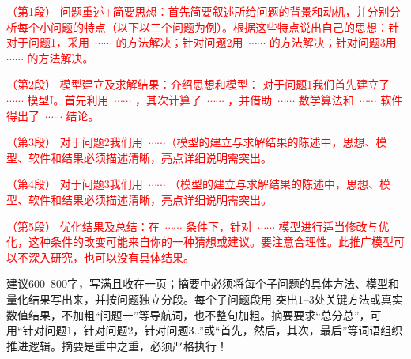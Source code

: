 

{\song\xiaosihao
\setlength{\parindent}{2em}\textcolor{red}{（第1段）	问题重述+简要思想：首先简要叙述所给问题的背景和动机，并分别分析每个小问题的特点（以下以三个问题为例）。根据这些特点说出自己的思想：针对于问题1，采用~$\cdots \cdots$ 的方法解决；针对问题2用~$\cdots \cdots$ 的方法解决；针对问题3用~$\cdots \cdots$ 的方法解决。}


\setlength{\parindent}{2em}\textcolor{red}{（第2段）	模型建立及求解结果：介绍思想和模型： 对于问题1我们首先建立了~$\cdots \cdots$ 模型I。首先利用~$\cdots \cdots$ ，其次计算了~$\cdots \cdots$ ，并借助~$\cdots \cdots$ 数学算法和~$\cdots \cdots$ 软件得出了~$\cdots \cdots$ 结论。}

\setlength{\parindent}{2em} \textcolor{red}{（第3段）	对于问题2我们用~$\cdots \cdots$（模型的建立与求解结果的陈述中，思想、模型、软件和结果必须描述清晰，亮点详细说明需突出。}

\setlength{\parindent}{2em}\textcolor{red}{（第4段）	对于问题3我们用~$\cdots \cdots$ （模型的建立与求解结果的陈述中，思想、模型、软件和结果必须描述清晰，亮点详细说明需突出。}

\setlength{\parindent}{2em}\textcolor{red}{（第5段）	优化结果及总结：在~$\cdots \cdots$ 条件下，针对~$\cdots \cdots$ 模型进行适当修改与优化，这种条件的改变可能来自你的一种猜想或建议。要注意合理性。此推广模型可以不深入研究，也可以没有具体结果。}
}

\begin{rmk}
建议600~800字，写满且收在一页；摘要中必须将每个子问题的具体方法、模型和量化结果写出来，并按问题独立分段。每个子问题段用 \textbf{} 突出1--3处关键方法或真实数值结果，不加粗“问题一”等导航词，也不整句加粗。摘要要求“总分总”，可用“针对问题1，针对问题2，针对问题3..”或“首先，然后，其次，最后”等词语组织推进逻辑。摘要是重中之重，必须严格执行！
\end{rmk}





